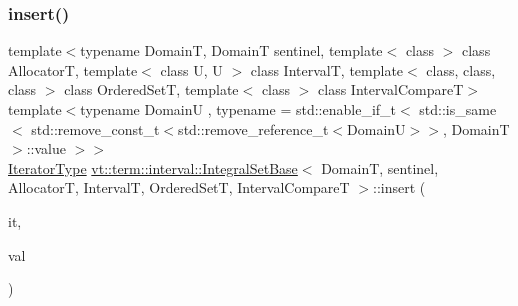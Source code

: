\subsubsection{\texorpdfstring{insert()}{insert()}\hspace{0.1cm}{\footnotesize\ttfamily [2/2]}}
{\footnotesize\ttfamily template$<$typename DomainT, DomainT sentinel, template$<$ class $>$ class AllocatorT, template$<$ class U, U $>$ class IntervalT, template$<$ class, class, class $>$ class Ordered\+SetT, template$<$ class $>$ class Interval\+CompareT$>$ \\
template$<$typename DomainU , typename  = std\+::enable\+\_\+if\+\_\+t$<$      std\+::is\+\_\+same$<$        std\+::remove\+\_\+const\+\_\+t$<$std\+::remove\+\_\+reference\+\_\+t$<$\+Domain\+U$>$$>$, Domain\+T      $>$\+::value    $>$$>$ \\
\hyperlink{structvt_1_1term_1_1interval_1_1_integral_set_base_a111b2ec1ea960a40ba4270be702f11f1}{Iterator\+Type} \hyperlink{structvt_1_1term_1_1interval_1_1_integral_set_base}{vt\+::term\+::interval\+::\+Integral\+Set\+Base}$<$ DomainT, sentinel, AllocatorT, IntervalT, Ordered\+SetT, Interval\+CompareT $>$\+::insert (\begin{DoxyParamCaption}\item[{\hyperlink{structvt_1_1term_1_1interval_1_1_integral_set_base_a111b2ec1ea960a40ba4270be702f11f1}{Iterator\+Type}}]{it,  }\item[{DomainU \&\&}]{val }\end{DoxyParamCaption})\hspace{0.3cm}{\ttfamily [inline]}}

\mbox{\label{structvt_1_1term_1_1interval_1_1_integral_set_base_ade802dbc86e759545ee5b3aaa9bf6396}} 
